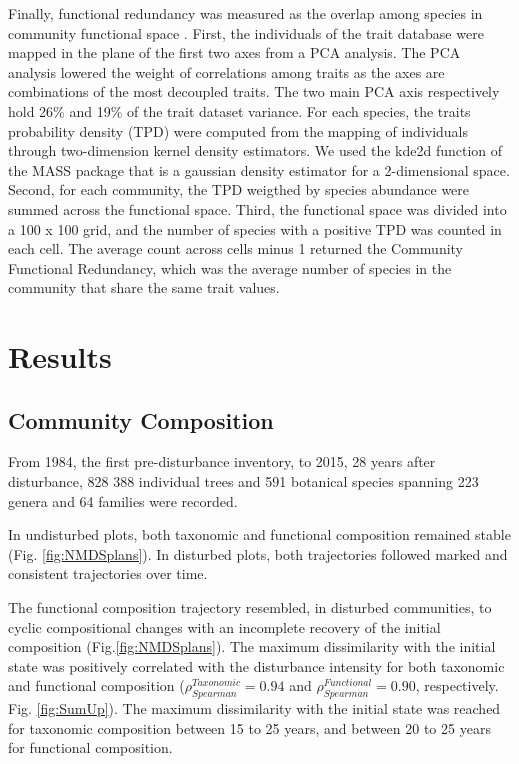 \documentclass[fleqn,10pt]{ArtEcoFoG} %
\begin{document}
Finally, functional redundancy was measured as the overlap among species in community functional space \citep{Carmona2016}.
First, the individuals of the trait database were mapped in the plane of the first two axes from a PCA analysis.
The PCA analysis lowered the weight of correlations among traits as the axes are combinations of the most decoupled traits.
\color{red}The two main PCA axis respectively hold 26\% and 19\% of the trait dataset variance.\color{black}
For each species, the traits probability density (TPD) were computed from the mapping of individuals through two-dimension kernel density estimators.
\color{red}
We used the kde2d function of the MASS package \citep{MASS2002} that is a gaussian density estimator for a 2-dimensional space.
\color{black}
Second, for each community, the TPD weigthed by species abundance were summed across the functional space. Third, the functional space was divided into a 100 x 100 grid, and the number of species with a positive TPD was counted in each cell.
The average count across cells minus 1 returned the Community Functional Redundancy, which was the average number of species in the community that share the same trait values.

\hypertarget{results}{%
\section{Results}\label{results}}

\hypertarget{community-composition}{%
\subsection{Community Composition}\label{community-composition}}

From 1984, the first pre-disturbance inventory, to 2015, 28 years after disturbance, 828 388 individual trees and 591 botanical species spanning 223 genera and 64 families were recorded.

In undisturbed plots, both taxonomic and functional composition remained stable (Fig. \ref{fig:NMDSplans}).
In disturbed plots, both trajectories followed marked and consistent trajectories over time.

The functional composition trajectory resembled, in disturbed communities, to cyclic compositional changes with an incomplete recovery of the initial composition (Fig.\ref{fig:NMDSplans}).
The maximum dissimilarity with the initial state was positively correlated with the disturbance intensity for both taxonomic and functional composition (\(\rho_{Spearman}^{Taxonomic}=0.94\) and \(\rho_{Spearman}^{Functional}=0.90\), respectively. Fig. \ref{fig:SumUp}).
The maximum dissimilarity with the initial state was reached for taxonomic composition between 15 to 25 years, and between 20 to 25 years for functional composition.
\end{document}

